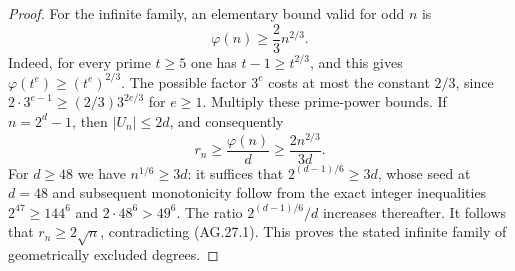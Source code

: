 \begin{proof}
For the infinite family, an elementary bound valid for
odd $n$ is
\[
                       \varphi(n)\ge\frac23 n^{2/3}.
\]
Indeed, for every prime $t\ge5$ one has
$t-1\ge t^{2/3}$, and this gives
$\varphi(t^e)\ge(t^e)^{2/3}$. The possible factor
$3^e$ costs at most the constant $2/3$, since
$2\cdot3^{e-1}\ge(2/3)3^{2e/3}$ for $e\ge1$.
Multiply these prime-power bounds.
If $n=2^d-1$, then $|U_n|\le2d$, and consequently
\[
 r_n\ge\frac{\varphi(n)}d
      \ge\frac{2n^{2/3}}{3d}.
\]
For $d\ge48$ we have $n^{1/6}\ge3d$: it suffices
that $2^{(d-1)/6}\ge3d$, whose seed at $d=48$
and subsequent monotonicity follow from the exact integer
inequalities $2^{47}\ge144^6$ and
$2\cdot48^6>49^6$. The ratio
$2^{(d-1)/6}/d$ increases thereafter.
It follows that $r_n\ge2\sqrt n$, contradicting
(AG.27.1). This proves the stated infinite family of
geometrically excluded degrees.
\end{proof}


